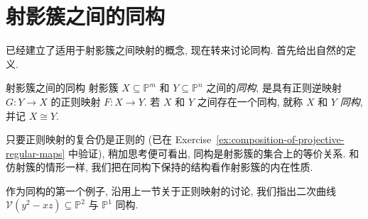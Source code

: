 \section{射影簇之间的同构}\label{sec:isomorphisms-of-projective-varieties}

已经建立了适用于射影簇之间映射的概念, 现在转来讨论同构. 首先给出自然的定义.

\begin{Definition}{射影簇之间的同构}\leavevmode\label{def:isomorphism-of-projective-varieties}
射影簇 $X\subseteq\mathbb{P}^{m}$ 和 $Y\subseteq\mathbb{P}^{n}$ 之间的\emph{同构}, 是具有正则逆映射 $G:Y\to X$ 的正则映射 $F:X\to Y$. 若 $X$ 和 $Y$ 之间存在一个同构, 就称 $X$ 和 $Y$ \emph{同构}, 并记 $X\cong Y$.
\end{Definition}

\begin{BookFlowNote}{%
只要正则映射的复合仍是正则的 (已在 Exercise~\ref{ex:composition-of-projective-regular-maps} 中验证), 稍加思考便可看出, 同构是射影簇的集合上的等价关系.
}
\noindent 和仿射簇的情形一样, 我们把在同构下保持的结构看作射影簇的内在性质.

作为同构的第一个例子, 沿用上一节关于正则映射的讨论, 我们指出二次曲线 $\mathcal{V}(y^{2}-xz)\subseteq\mathbb{P}^{2}$ 与 $\mathbb{P}^{1}$ 同构.
\end{BookFlowNote}

